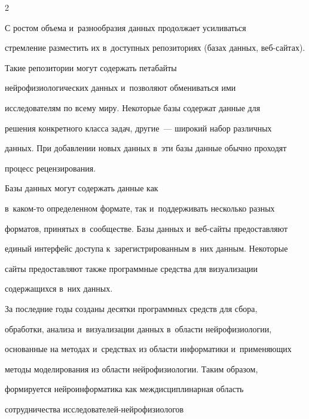 \begin{multicols}{2}
{}


    


    С ростом объема и~разнообразия данных продолжает усиливаться 


стремление разместить их в~доступных репозиториях (базах данных, веб-сай\-тах). 


Такие репозитории могут содержать петабайты 


нейрофизиологических данных и~позволяют обмениваться ими 


исследователям по всему миру. Некоторые базы содержат данные для 


решения конкретного класса задач, другие~--- широкий набор различных 


данных. При добавлении новых данных в~эти базы данные обычно проходят 


процесс рецензирования. 





Базы данных могут содержать данные как  


в~ка\-ком-то определенном формате, так и~поддерживать несколько разных 


форматов, принятых в~сообществе. Базы данных и~веб-сай\-ты предоставляют 


единый интерфейс доступа к~зарегистрированным в~них данным. Некоторые 


сайты предоставляют также программные средства для визуализации 


содержащихся в~них данных. 


{ %





}


    


    За последние годы созданы десятки про\-грам\-мных средств для сбора, 


обработки, анализа и~визуализации данных в~области нейрофизиологии, 


основанные на методах и~средствах из области информатики и~применяющих 


методы моделирования из области нейрофизиологии. Таким образом,\linebreak 


формируется нейроинформатика как меж\-дис\-цип\-ли\-нар\-ная об\-ласть 


сотрудничества ис\-сле\-до\-ва\-те\-лей-ней\-ро\-фи\-зио\-ло\-гов  



\end{multicols}
